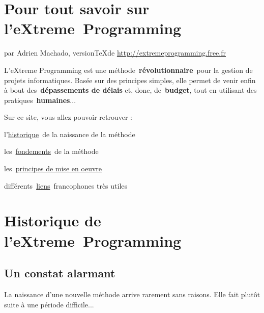 \documentclass[]{article}
\date{}
\begin{document}
\section{Pour tout savoir sur l'eXtreme~Programming}

par Adrien Machado, version\TeX de \url{http://extremeprogramming.free.fr}

L'eXtreme Programming est une méthode~\textbf{révolutionnaire}~pour la
gestion de projets informatiques.
Basée sur des principes simples, elle permet de venir enfin à bout
des~\textbf{dépassements de délais}
et, donc, de~\textbf{budget}, tout en utilisant des
pratiques~\textbf{humaines}...


\tableofcontents



Sur ce site, vous allez pouvoir retrouver :~

l'\href{http://extremeprogramming.free.fr/page.php?page=historique}{{h}{istorique}}~de
la naissance de la méthode

les~\href{http://extremeprogramming.free.fr/page.php?page=fondements}{{f}{ondements}}~de
la méthode

les~\href{http://extremeprogramming.free.fr/page.php?page=principes}{{p}{rincipes
de mise en oeuvre}}

différents~\href{http://extremeprogramming.free.fr/liens.php}{{l}{iens}}~francophones
très utiles

\hypertarget{historique-de-lextreme-programming}{%
\section{\texorpdfstring{\textbf{Historique de
l'eXtreme~Programming}}{Historique de l'eXtreme~Programming}}\label{historique-de-lextreme-programming}}














\subsection{\texorpdfstring{\textbf{Un constat
alarmant}}{Un constat alarmant}}\label{un-constat-alarmant}

La naissance d'une nouvelle méthode arrive rarement sans raisons. Elle
fait plutôt suite à une période difficile...
\end{document}
